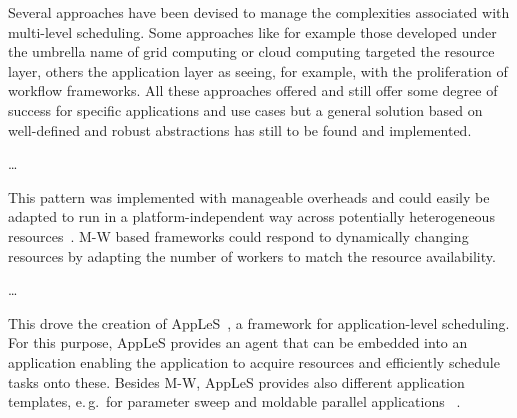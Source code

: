 \documentclass{sig-alternate}
\begin{document}
Several approaches have been devised to manage the complexities associated with
multi-level scheduling. Some approaches like for example those developed under
the umbrella name of grid computing or cloud computing targeted the resource
layer, others the application layer as seeing, for example, with the
proliferation of workflow frameworks. All these approaches offered and still
offer some degree of success for specific applications and use cases but a
general solution based on well-defined and robust abstractions has still to be
found and implemented.


\ldots

This pattern was implemented with manageable overheads and could easily be
adapted to run in a platform-independent way across potentially heterogeneous
resources~\cite{masterworker, Goux00anenabling}. M-W based frameworks could
respond to dynamically changing resources by adapting the number of workers to
match the resource availability.

\ldots

This drove the creation of AppLeS~\cite{Berman:1996:apples}, a framework for
application-level scheduling. For this purpose, AppLeS provides an agent that
can be embedded into an application enabling the application to acquire
resources%
and efficiently schedule tasks onto these. Besides M-W, AppLeS provides also
different application templates, e.\,g.\ for parameter sweep and moldable
parallel applications ~\cite{Berman:2003:ACG:766629.766632}.


%


%
%
\end{document}
